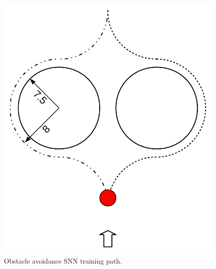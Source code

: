 \begin{frame}
\begin{columns}
\begin{overprint}
\begin{figure}
					\includegraphics[height=0.6\textheight]{img/oa_training_path.pdf}
					\caption{Obstacle avoidance SNN training path.}
					\label{fig:oa_training_path}
				\end{figure}
			\end{overprint}
	\end{columns}
\end{frame}
